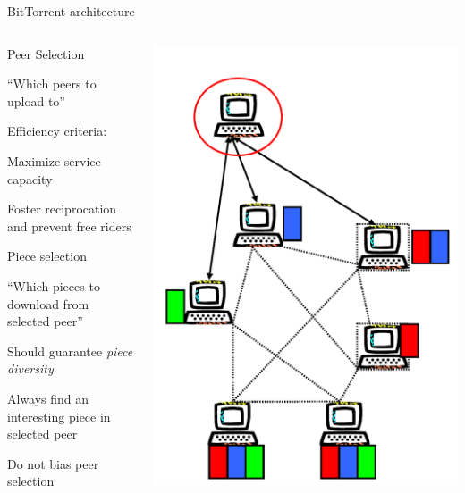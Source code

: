 \begin{frame}{BitTorrent architecture}

\begin{columns}
\begin{column}{0.60\textwidth}
\BIL
\item \alert{Peer Selection}
	\BI
	\item “Which peers to upload to”
	\item Efficiency criteria:
		\BI
		\item Maximize service capacity
		\item Foster reciprocation and prevent free riders
		\EI
	\EI
\item \alert{Piece selection}
	\BI
	\item “Which pieces to download from selected peer”
	\item Should guarantee \textit{piece diversity}
		\BI
		\item Always find an interesting piece in selected peer
		\item Do not bias peer selection
		\EI
	\EI
\EIL
\end{column}	
\begin{column}{0.38\textwidth}
\includegraphics[width=\textwidth]{figs/10/bt-arch2}	
\end{column}
\end{columns}
\end{frame}


